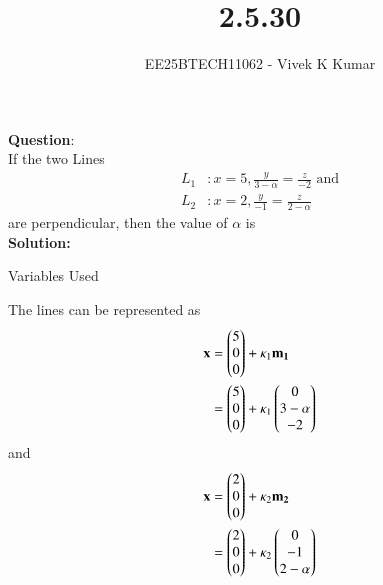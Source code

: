 \documentclass[journal]{IEEEtran}
\title{2.5.30}
\author{EE25BTECH11062 - Vivek K Kumar}
\begin{document}
\maketitle

\renewcommand{\thefigure}{\theenumi}
\renewcommand{\thetable}{\theenumi}


\textbf{Question}:\\
If the two Lines 
\begin{align}
    L_1 &: x=5, \frac{y}{3-\alpha} = \frac{z}{-2} \text{ and} \\
    L_2 &: x=2, \frac{y}{-1} = \frac{z}{2-\alpha}
\end{align}
are perpendicular, then the value of $\alpha$ is \underline{\hspace{0.1\columnwidth}}
\\
\textbf{Solution: }
\begin{table}[H]    
  \centering
  
  \caption{Variables Used}
  \label{tab:2.5.30}
\end{table}
The lines can be represented as\\
\begin{align}
\mathbf{x} &= \begin{pmatrix}5\\0\\0\end{pmatrix} + \kappa_1\mathbf{m_1}\\
           &= \begin{pmatrix}5\\0\\0\end{pmatrix} + \kappa_1\begin{pmatrix}0\\3-\alpha\\-2\end{pmatrix}
\end{align}
and 
\begin{align}
\mathbf{x} &= \begin{pmatrix}2\\0\\0\end{pmatrix} + \kappa_2\mathbf{m_2}\\
           &= \begin{pmatrix}2\\0\\0\end{pmatrix} + \kappa_2\begin{pmatrix}0\\-1\\2-\alpha\end{pmatrix}
\end{align}
\end{document}
